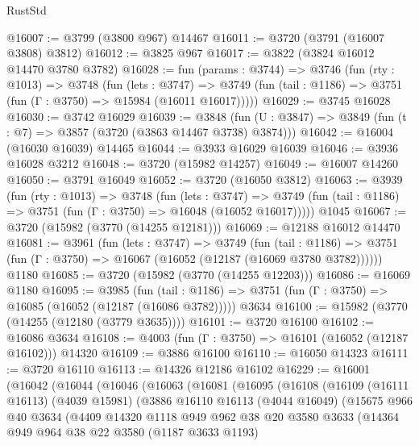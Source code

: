 \begin{lexlean}{RustStd}
\begin{coremodule}
@16007 := @3799 (@3800 @967) @14467
@16011 := @3720 (@3791 (@16007 @3808) @3812)
@16012 := @3825 @967
@16017 := @3822 (@3824 @16012 @14470 @3780 @3782)
@16028 := fun (params : @3744) =>
  @3746
    (fun (rty : @1013) =>
    @3748
      (fun (lets : @3747) =>
      @3749 (fun (tail : @1186) => @3751 (fun (Γ : @3750) => @15984 (@16011 @16017)))))
@16029 := @3745 @16028
@16030 := @3742 @16029
@16039 := @3848
    (fun (U : @3847) => @3849 (fun (t : @7) => @3857 (@3720 (@3863 @14467 @3738) @3874)))
@16042 := @16004 (@16030 @16039) @14465
@16044 := @3933 @16029 @16039
@16046 := @3936 @16028 @3212
@16048 := @3720 (@15982 @14257)
@16049 := @16007 @14260
@16050 := @3791 @16049
@16052 := @3720 (@16050 @3812)
@16063 := @3939
    (fun (rty : @1013) =>
    @3748
      (fun (lets : @3747) =>
      @3749 (fun (tail : @1186) => @3751 (fun (Γ : @3750) => @16048 (@16052 @16017)))))
    @1045
@16067 := @3720 (@15982 (@3770 (@14255 @12181)))
@16069 := @12188 @16012 @14470
@16081 := @3961
    (fun (lets : @3747) =>
    @3749
      (fun (tail : @1186) =>
      @3751 (fun (Γ : @3750) => @16067 (@16052 (@12187 (@16069 @3780 @3782))))))
    @1180
@16085 := @3720 (@15982 (@3770 (@14255 @12203)))
@16086 := @16069 @1180
@16095 := @3985
    (fun (tail : @1186) => @3751 (fun (Γ : @3750) => @16085 (@16052 (@12187 (@16086 @3782)))))
    @3634
@16100 := @15982 (@3770 (@14255 (@12180 (@3779 @3635))))
@16101 := @3720 @16100
@16102 := @16086 @3634
@16108 := @4003 (fun (Γ : @3750) => @16101 (@16052 (@12187 @16102))) @14320
@16109 := @3886 @16100
@16110 := @16050 @14323
@16111 := @3720 @16110
@16113 := @14326 @12186 @16102
@16229 := @16001
    (@16042
      (@16044
        (@16046
          (@16063
            (@16081
              (@16095
                (@16108
                  (@16109
                    (@16111 @16113)
                    (@4039 @15981)
                    (@3886
                      @16110
                      @16113
                      (@4044 @16049)
                      (@15675
                        @966
                        @40
                        @3634
                        (@4409
                          @14320
                          @1118
                          @949
                          @962
                          @38
                          @20
                          @3580
                          @3633
                          (@14364
                            @949
                            @964
                            @38
                            @22
                            @3580
                            (@1187 @3633 @1193)

\end{coremodule}
\end{lexlean}
